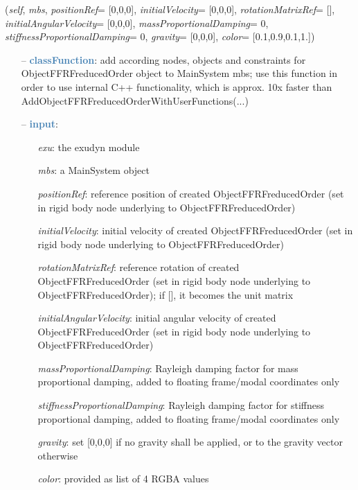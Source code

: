\begin{itemize}[leftmargin=1.4cm]
\begin{itemize}[leftmargin=1.4cm]
\begin{itemize}[leftmargin=1.4cm]
\begin{itemize}[leftmargin=0.5cm]
\begin{itemize}[leftmargin=1.4cm]
\begin{itemize}[leftmargin=1.4cm]
\begin{itemize}[leftmargin=0.5cm]
\begin{flushleft}
({\it self}, {\it mbs}, {\it positionRef}= [0,0,0], {\it initialVelocity}= [0,0,0], {\it rotationMatrixRef}= [], {\it initialAngularVelocity}= [0,0,0], {\it massProportionalDamping}= 0, {\it stiffnessProportionalDamping}= 0, {\it gravity}= [0,0,0], {\it color}= [0.1,0.9,0.1,1.])
\end{flushleft}
\setlength{\itemindent}{0.7cm}
\begin{itemize}[leftmargin=0.7cm]
\item[--]\textcolor{steelblue}{\bf classFunction}: add according nodes, objects and constraints for ObjectFFRFreducedOrder object to MainSystem mbs; use this function in order to use internal C++ functionality, which is approx. 10x faster than AddObjectFFRFreducedOrderWithUserFunctions(...)
\item[--]\textcolor{steelblue}{\bf input}: \vspace{-6pt}
\begin{itemize}[leftmargin=1.2cm]
\setlength{\itemindent}{-0.7cm}
\item[]{\it exu}: the exudyn module
\item[]{\it mbs}: a MainSystem object
\item[]{\it positionRef}: reference position of created ObjectFFRFreducedOrder (set in rigid body node underlying to ObjectFFRFreducedOrder)
\item[]{\it initialVelocity}: initial velocity of created ObjectFFRFreducedOrder (set in rigid body node underlying to ObjectFFRFreducedOrder)
\item[]{\it rotationMatrixRef}: reference rotation of created ObjectFFRFreducedOrder (set in rigid body node underlying to ObjectFFRFreducedOrder); if [], it becomes the unit matrix
\item[]{\it initialAngularVelocity}: initial angular velocity of created ObjectFFRFreducedOrder (set in rigid body node underlying to ObjectFFRFreducedOrder)
\item[]{\it massProportionalDamping}: Rayleigh damping factor for mass proportional damping, added to floating frame/modal coordinates only
\item[]{\it stiffnessProportionalDamping}: Rayleigh damping factor for stiffness proportional damping, added to floating frame/modal coordinates only
\item[]{\it gravity}: set [0,0,0] if no gravity shall be applied, or to the gravity vector otherwise
\item[]{\it color}: provided as list of 4 RGBA values
\end{itemize}

\end{itemize}
\end{itemize}
\end{itemize}
\end{itemize}
\end{itemize}
\end{itemize}
\end{itemize}
\end{itemize}
